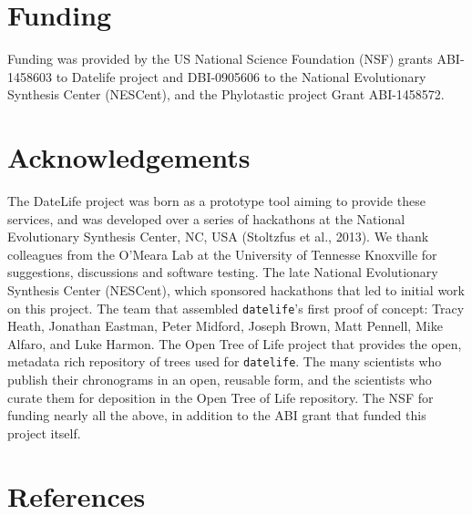 \documentclass[
  english,
  man]{apa6}
\begin{document}
\hypertarget{funding}{%
\section{Funding}\label{funding}}

Funding was provided by the US National Science Foundation (NSF) grants ABI-1458603 to Datelife project and DBI-0905606 to the National Evolutionary Synthesis Center (NESCent), and the Phylotastic project Grant ABI-1458572.

\hypertarget{acknowledgements}{%
\section{Acknowledgements}\label{acknowledgements}}

The DateLife project was born as a prototype tool aiming to provide these services, and was developed over a series of hackathons at the National Evolutionary Synthesis Center, NC, USA (Stoltzfus et al., 2013).
We thank colleagues from the O'Meara Lab at the University
of Tennesse Knoxville for suggestions, discussions and software testing.
The late National Evolutionary Synthesis Center (NESCent), which sponsored hackathons
that led to initial work on this project. The team that assembled \texttt{datelife}'s first proof of concept: Tracy Heath, Jonathan Eastman, Peter Midford, Joseph Brown, Matt Pennell, Mike Alfaro, and Luke Harmon.
The Open Tree of Life project that provides the open, metadata rich repository of
trees used for \texttt{datelife}.
The many scientists who publish their chronograms in an open, reusable form, and
the scientists who curate them for deposition in the Open Tree of Life repository.
The NSF for funding nearly all the above, in addition to the ABI grant that funded this project itself.

\newpage

\hypertarget{references}{%
\section{References}\label{references}}

\begingroup
\setlength{\parindent}{-0.5in}
\setlength{\leftskip}{0.5in}
\end{document}

